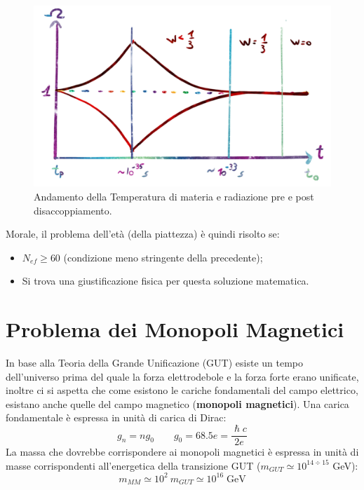 \begin{figure}[h]
    \centering
    \includegraphics[width=.7\textwidth]{Pictures/4/omegainflation.png}
    \caption{Andamento della Temperatura di materia e radiazione pre e post disaccoppiamento.}
    \label{fig:4}
\end{figure}

\vspace{1em}
\noindent Morale, il problema dell'età (della piattezza) è quindi risolto se:
\begin{itemize}
    \item $N_{ef} \ge 60$ (condizione meno stringente della precedente);
    \item Si trova una giustificazione fisica per questa soluzione matematica.
\end{itemize}




\section{Problema dei Monopoli Magnetici}
In base alla Teoria della Grande Unificazione (GUT) esiste un tempo dell'universo prima del quale la forza elettrodebole e la forza forte erano unificate, inoltre ci si aspetta che come esistono le cariche fondamentali del campo elettrico, esistano anche quelle del campo magnetico (\textbf{monopoli magnetici}). Una carica fondamentale è espressa in unità di carica di Dirac:
\begin{equation*} 
    g_n = n g_0 \qquad g_0 = 68.5 e = \frac{\hslash c}{2e}
\end{equation*}
La massa che dovrebbe corrispondere ai monopoli magnetici è espressa in unità di masse corrispondenti all'energetica della transizione GUT ($m_{GUT}\simeq 10^{14\div 15}$ GeV):
\begin{equation*} 
    m_{MM}\simeq 10^2 ~m_{GUT} \simeq 10^{16}\; \mathrm{GeV}
\end{equation*}

